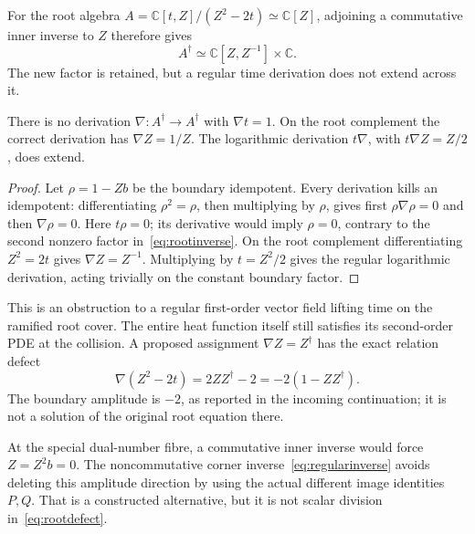 \documentclass[11pt,a4paper]{article}
\theoremstyle{definition}\newtheorem{definition}[theorem]{Definition}\newtheorem{remark}[theorem]{Remark}
\newcommand{\C}{\mathbb C}\newcommand{\R}{\mathbb R}\newcommand{\Z}{\mathbb Z}\newcommand{\B}{\mathbb B}
\begin{document}
For the root algebra $A=\C[t,Z]/(Z^2-2t)\simeq\C[Z]$, adjoining a commutative inner inverse to $Z$ therefore gives
\begin{equation}
 A^\dagger\simeq\C[Z,Z^{-1}]\times\C.                   \label{eq:rootinverse}
\end{equation}
The new factor is retained, but a regular time derivation does not extend across it.
\begin{proposition}
There is no derivation $\nabla:A^\dagger\to A^\dagger$ with $\nabla t=1$. On the root complement the correct derivation has $\nabla Z=1/Z$. The logarithmic derivation $t\nabla$, with $t\nabla Z=Z/2$, does extend.
\end{proposition}
\begin{proof}
Let $\rho=1-Zb$ be the boundary idempotent. Every derivation kills an idempotent: differentiating $\rho^2=\rho$, then multiplying by $\rho$, gives first $\rho\nabla\rho=0$ and then $\nabla\rho=0$. Here $t\rho=0$; its derivative would imply $\rho=0$, contrary to the second nonzero factor in~\eqref{eq:rootinverse}. On the root complement differentiating $Z^2=2t$ gives $\nabla Z=Z^{-1}$. Multiplying by $t=Z^2/2$ gives the regular logarithmic derivation, acting trivially on the constant boundary factor.
\end{proof}
This is an obstruction to a regular first-order vector field lifting time on the ramified root cover. The entire heat function itself still satisfies its second-order PDE at the collision. A proposed assignment $\nabla Z=Z^\dagger$ has the exact relation defect
\begin{equation}
 \nabla(Z^2-2t)=2ZZ^\dagger-2=-2(1-ZZ^\dagger).          \label{eq:rootdefect}
\end{equation}
The boundary amplitude is $-2$, as reported in the incoming continuation; it is not a solution of the original root equation there.

At the special dual-number fibre, a commutative inner inverse would force $Z=Z^2b=0$. The noncommutative corner inverse~\eqref{eq:regularinverse} avoids deleting this amplitude direction by using the actual different image identities $P,Q$. That is a constructed alternative, but it is not scalar division in~\eqref{eq:rootdefect}.
\end{document}
